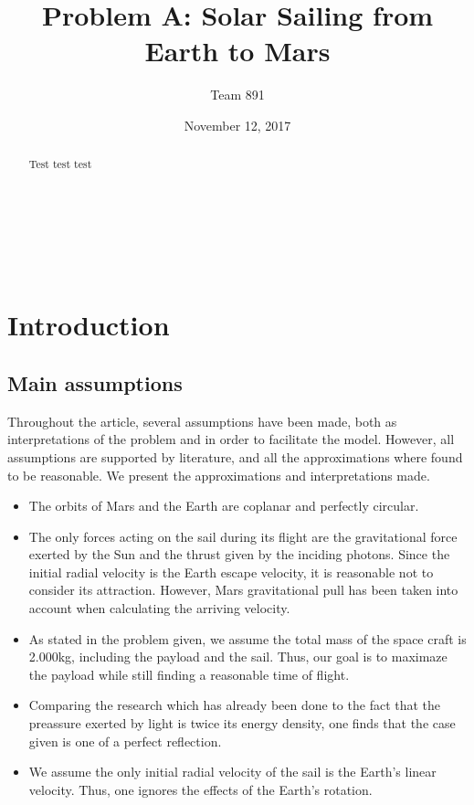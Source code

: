 \documentclass[twocolumn,12pt,a4paper]{article}
\author{\textsf{Team 891}}
\title{\textsf{\textbf{Problem A: Solar Sailing from Earth to Mars}}}
\date{\textsf{November 12, 2017}}
\numberwithin{equation}{section}
\begin{document}
\renewcommand{\abstractname}{}
\renewcommand{\absnamepos}{empty}
\begin{titlingpage}
 \maketitle

\noindent \hrulefill \\
\begin{abstract}
Test test test

\end{abstract}
\hrulefill \\

\end{titlingpage}

\clearpage

\section{Introduction}
\subsection{Main assumptions}
Throughout the article, several assumptions have been made, both as interpretations of the problem and in order to facilitate the model. However, all assumptions are supported by literature, and all the approximations where found to be reasonable. We present the approximations and interpretations made.
\begin{itemize}
\item The orbits of Mars and the Earth are coplanar and perfectly circular.
\item The only forces acting on the sail during its flight are the gravitational force exerted by the Sun and the thrust given by the inciding photons. Since the initial radial velocity is the Earth escape velocity, it is reasonable not to consider its attraction. However, Mars gravitational pull has been taken into account when calculating the arriving velocity.
\item As stated in the problem given, we assume the total mass of the space craft is 2.000kg, including the payload and the sail. Thus, our goal is to maximaze the payload while still finding a reasonable time of flight. 
\item Comparing the research which has already been done to the fact that the preassure exerted by light is twice its energy density, one finds that the case given is one of a perfect reflection.
\item We assume the only initial radial velocity of the sail is the Earth's linear velocity. Thus, one ignores the effects of the Earth's rotation.
\end{itemize}
\end{document}
